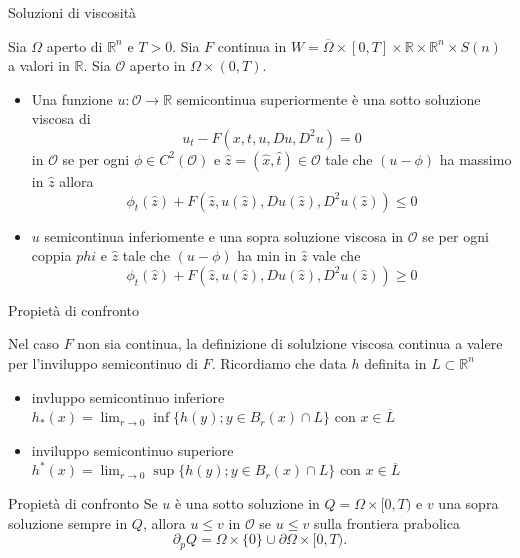 \begin{frame}{Soluzioni di viscosità}
  \begin{definizione}
    Sia $\Omega$ aperto di $\mathbb{R}^n$ e $T>0$. Sia $F$ continua in
    $W=\overline{\Omega}\times
    [0,T]\times\mathbb{R}\times\mathbb{R}^n\times S(n)$ a valori in
    $\mathbb{R}$. Sia $\mathcal{O}$ aperto in $\Omega\times(0,T)$.
    \begin{itemize}
      \item Una funzione $u:\mathcal{O}\to\mathbb{R}$ semicontinua
        superiormente è una \alert{sotto
          soluzione viscosa} di 
        \[
        u_t-F(x,t,u,Du,D^2u)=0
        \]
        in $\mathcal{O}$ se per ogni $\phi\in C^2(\mathcal{O})$ e
        $\hat{z}=(\hat{x},\hat{t})\in\mathcal{O}$ tale che $(u-\phi)$ ha
        massimo in $\hat{z}$ allora
        \[
        \phi_t(\hat{z})+F(\hat{z},u(\hat{z}),Du(\hat{z}),D^2u(\hat{z}))\leq 0
        \]
        \item $u$ semicontinua inferiomente e una \alert{sopra
          soluzione viscosa}  in $\mathcal{O}$ se per ogni coppia
          $phi$ e $\hat{z}$ tale che $(u-\phi)$ ha min in $\hat{z}$
          vale che
          \[
          \phi_t(\hat{z})+F(\hat{z},u(\hat{z}),Du(\hat{z}),D^2u(\hat{z}))\geq 0
          \]
        \end{itemize}
  \end{definizione}
\end{frame}

\begin{frame}{Propietà di confronto}
  \begin{osservazione}
    Nel caso $F$ non sia continua, la definizione di solulzione
    viscosa continua a valere per l'inviluppo semicontinuo di
    $F$. Ricordiamo che data $h$ definita in $L\subset\mathbb{R}^n$
    \begin{itemize}
    \item  invluppo semicontinuo inferiore $h_*(x)=\lim_{r\to
      0}\inf\{h(y); y\in B_r(x)\cap L\}$ con $x\in\overline{L}$
    \item inviluppo semicontinuo superiore $h^*(x)=\lim_{r\to
      0}\sup\{h(y);y\in B_r(x)\cap L\}$ con $x\in\overline{L}$
    \end{itemize}
  \end{osservazione}
  \begin{block}{Propietà di confronto}
    Se $u$ è una sotto soluzione in $Q=\Omega\times[0,T)$ e
      $v$ una sopra  soluzione sempre in $Q$,  allora $u\leq
      v$ in $\mathcal{O}$ se $u\leq v$ sulla frontiera prabolica 
    \[
    \partial_pQ=\Omega\times\{0\}\cup\partial\Omega\times[0,T).
    \]
  \end{block}
\end{frame}

